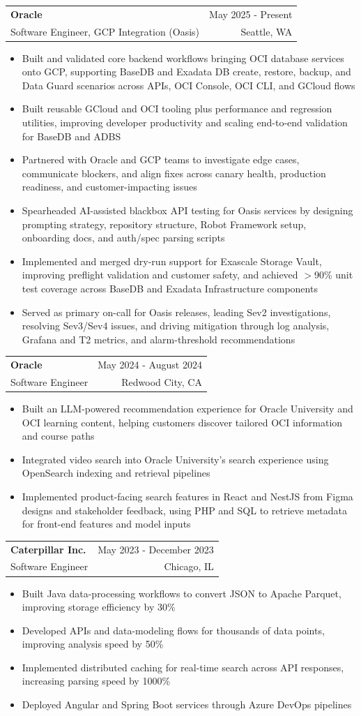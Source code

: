 \documentclass[letterpaper,11pt]{article}
\makeatletter
\newcommand{\resumeItem}[1]{
  \item\small{
    {#1 \vspace{-2pt}}
  }
}
\newcommand{\resumeSubheading}[4]{
  \vspace{-2pt}\item
    \begin{tabular*}{0.97\textwidth}[t]{l@{\extracolsep{\fill}}r}
      \textbf{#1} & #2 \\
      {\small#3} & {\small #4} \\
    \end{tabular*}\vspace{-7pt}
}
\newcommand{\resumeItemListStart}{\begin{itemize}}
\newcommand{\resumeItemListEnd}{\end{itemize}\vspace{-5pt}}
\makeatother
\begin{document}
    \resumeSubheading
  {Oracle}{May 2025 - Present}
  {Software Engineer, GCP Integration (Oasis)}{Seattle, WA}
  \resumeItemListStart
    \resumeItem{Built and validated core backend workflows bringing OCI database services onto GCP, supporting BaseDB and Exadata DB create, restore, backup, and Data Guard scenarios across APIs, OCI Console, OCI CLI, and GCloud flows}
    \resumeItem{Built reusable GCloud and OCI tooling plus performance and regression utilities, improving developer productivity and scaling end-to-end validation for BaseDB and ADBS}
    \resumeItem{Partnered with Oracle and GCP teams to investigate edge cases, communicate blockers, and align fixes across canary health, production readiness, and customer-impacting issues}
    \resumeItem{Spearheaded AI-assisted blackbox API testing for Oasis services by designing prompting strategy, repository structure, Robot Framework setup, onboarding docs, and auth/spec parsing scripts}
    \resumeItem{Implemented and merged dry-run support for Exascale Storage Vault, improving preflight validation and customer safety, and achieved $>$90\% unit test coverage across BaseDB and Exadata Infrastructure components}
    \resumeItem{Served as primary on-call for Oasis releases, leading Sev2 investigations, resolving Sev3/Sev4 issues, and driving mitigation through log analysis, Grafana and T2 metrics, and alarm-threshold recommendations}
  \resumeItemListEnd

    \resumeSubheading
      {Oracle}{May 2024 - August 2024}
      {Software Engineer}{Redwood City, CA}
      \resumeItemListStart
        \resumeItem{Built an LLM-powered recommendation experience for Oracle University and OCI learning content, helping customers discover tailored OCI information and course paths}
        \resumeItem{Integrated video search into Oracle University's search experience using OpenSearch indexing and retrieval pipelines}
        \resumeItem{Implemented product-facing search features in React and NestJS from Figma designs and stakeholder feedback, using PHP and SQL to retrieve metadata for front-end features and model inputs}
      \resumeItemListEnd

    \resumeSubheading
      {Caterpillar Inc.}{May 2023 - December 2023}
      {Software Engineer}{Chicago, IL}
      \resumeItemListStart
        \resumeItem{Built Java data-processing workflows to convert JSON to Apache Parquet, improving storage efficiency by 30\%}
        \resumeItem{Developed APIs and data-modeling flows for thousands of data points, improving analysis speed by 50\%}
        \resumeItem{Implemented distributed caching for real-time search across API responses, increasing parsing speed by 1000\%}
        \resumeItem{Deployed Angular and Spring Boot services through Azure DevOps pipelines}
      \resumeItemListEnd
\end{document}
